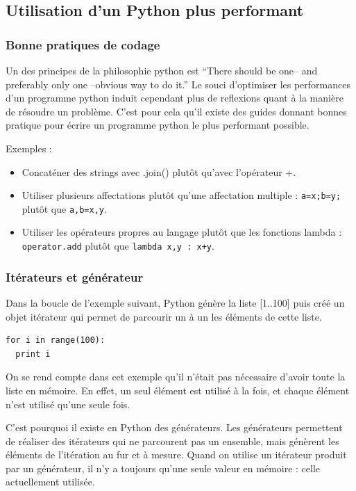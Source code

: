 \documentclass[a4paper]{article}
\begin{document}
\subsection{Utilisation d'un Python plus performant}

\label{OptCode}

\subsubsection{Bonne pratiques de codage}

Un des principes de la philosophie python est ``There should be one--
and preferably only one --obvious way to do it.''\cite{ZenPython} Le
souci d'optimiser les performances d'un programme python induit
cependant plus de reflexions quant à la manière de résoudre un
problème. C'est pour cela qu'il existe des guides donnant bonnes
pratique pour écrire un programme python le plus performant
possible\cite{PythonSpeed}.

Exemples :
\begin{itemize}
\item Concaténer des strings avec .join() plutôt qu'avec l'opérateur +.
\item Utiliser plusieurs affectations plutôt qu'une affectation
  multiple : \lstinline|a=x;b=y;| plutôt que \lstinline|a,b=x,y|.
\item Utiliser les opérateurs propres au langage plutôt que les
  fonctions lambda : \lstinline|operator.add| plutôt que
  \lstinline|lambda x,y : x+y|.
\end{itemize}

\subsubsection{Itérateurs et générateur}

Dans la boucle de l'exemple suivant, Python génère la liste [1..100]
puis créé un objet itérateur qui permet de parcourir un à un les
éléments de cette liste.

\begin{lstlisting}
for i in range(100):
  print i
\end{lstlisting}

On se rend compte dans cet exemple qu'il n'était pas nécessaire
d'avoir toute la liste en mémoire. En effet, un seul élément est
utilisé à la fois, et chaque élément n'est utilisé qu'une seule fois.

C'est pourquoi il existe en Python des générateurs. Les générateurs
permettent de réaliser des itérateurs qui ne parcourent pas un
ensemble, mais génèrent les éléments de l'itération au fur et à
mesure. Quand on utilise un itérateur produit par un générateur, il
n'y a toujours qu'une seule valeur en mémoire : celle actuellement
utilisée.
\end{document}
